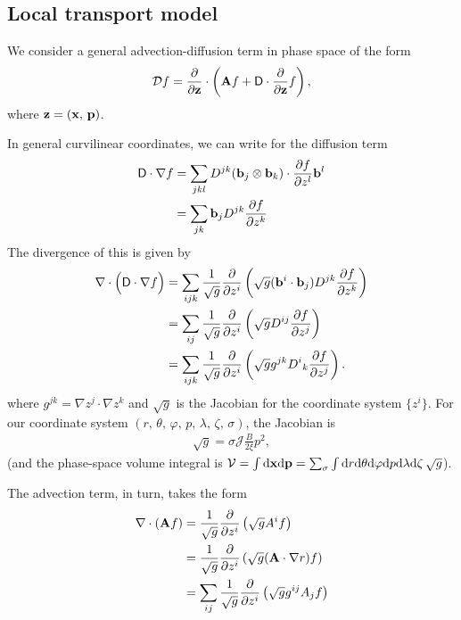 \documentclass[11pt,a4paper]{article}
\newcommand{\rd}{\ensuremath{\mathrm{d}}}
\renewcommand{\b}[1]{\ensuremath{ {\bf #1 } }}
\begin{document}
\subsection{Local transport model}
We consider a general advection-diffusion term in phase space of the form
\begin{align}
\mathcal{D}f = \frac{\partial}{\partial \b{z}} \cdot \left(\b{A}f + \mathsf{D}\cdot\frac{\partial}{\partial \b{z}} f\right),
\end{align}
where $\b{z} = (\b{x},\,\b{p})$. 

In general curvilinear coordinates, we can write for the diffusion term
\begin{align}
\mathsf{D}\cdot\nabla f &= \sum_{jkl} D^{jk} (\b{b}_j \otimes \b{b}_k) \cdot \frac{\partial f}{\partial z^l}  \b{b}^l \nonumber \\
&=  \sum_{jk}\b{b}_j D^{jk} \frac{\partial f}{\partial z^k}%
\end{align}
The divergence of this is given by
\begin{align}
\nabla \cdot \Big(\mathsf{D}\cdot\nabla f \Big) &= \sum_{ijk} \frac{1}{\sqrt{g}}\frac{\partial}{\partial z^i}\left(\sqrt{g} (\b{b}^i\cdot\b{b}_j)D^{jk}\frac{\partial f}{\partial z^k}\right) \nonumber \\
&= \sum_{ij} \frac{1}{\sqrt{g}}\frac{\partial}{\partial z^i}\left(\sqrt{g} D^{ij}\frac{\partial f}{\partial z^j}\right)  \nonumber \\
&= \sum_{ijk} \frac{1}{\sqrt{g}}\frac{\partial}{\partial z^i}\left(\sqrt{g} g^{jk} {D^i}_k\frac{\partial f}{\partial z^j}\right) .
%
\end{align}
where $g^{jk} = \nabla z^j \cdot \nabla z^k$ and $\sqrt{g}$ is the Jacobian for the coordinate system $\{z^i\}$. For our coordinate system $(r,\,\theta,\,\varphi,\,p,\,\lambda,\,\zeta,\,\sigma)$, the Jacobian is 
\begin{align}
\sqrt{g} = \sigma \mathcal{J}\frac{B}{2\xi}p^2,
\end{align}
(and the phase-space volume integral is $\mathcal{V} = \int \rd \b{x} \rd\b{p} = \sum_\sigma \int \rd r \rd \theta \rd\varphi \rd p \rd \lambda \rd \zeta \,\sqrt{g}$).

The advection term, in turn, takes the form
\begin{align}
\nabla \cdot (\b{A}f) &= \frac{1}{\sqrt{g}}\frac{\partial}{\partial z^i} \left(\sqrt{g}A^i f\right) \nonumber \\
&= \frac{1}{\sqrt{g}}\frac{\partial}{\partial z^i} \left(\sqrt{g}(\b{A} \cdot \nabla r) f\right) \nonumber \\
&=\sum_{ij} \frac{1}{\sqrt{g}}\frac{\partial}{\partial z^i} \left(\sqrt{g}g^{ij} A_j f\right) 
\end{align}
\end{document}
